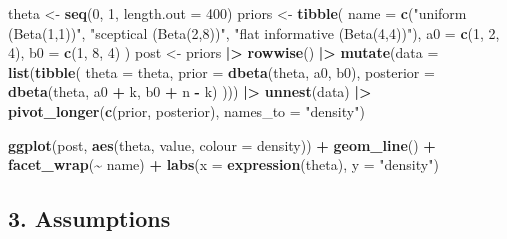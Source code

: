 \documentclass[
]{article}
\newenvironment{Shaded}{\begin{snugshade}}{\end{snugshade}}
\newcommand{\AttributeTok}[1]{\textcolor[rgb]{0.13,0.29,0.53}{#1}}
\newcommand{\DecValTok}[1]{\textcolor[rgb]{0.00,0.00,0.81}{#1}}
\newcommand{\FunctionTok}[1]{\textcolor[rgb]{0.13,0.29,0.53}{\textbf{#1}}}
\newcommand{\NormalTok}[1]{#1}
\newcommand{\OtherTok}[1]{\textcolor[rgb]{0.56,0.35,0.01}{#1}}
\newcommand{\SpecialCharTok}[1]{\textcolor[rgb]{0.81,0.36,0.00}{\textbf{#1}}}
\newcommand{\StringTok}[1]{\textcolor[rgb]{0.31,0.60,0.02}{#1}}
\begin{document}
\begin{Shaded}
\begin{Highlighting}[]
\NormalTok{theta }\OtherTok{\textless{}{-}} \FunctionTok{seq}\NormalTok{(}\DecValTok{0}\NormalTok{, }\DecValTok{1}\NormalTok{, }\AttributeTok{length.out =} \DecValTok{400}\NormalTok{)}
\NormalTok{priors }\OtherTok{\textless{}{-}} \FunctionTok{tibble}\NormalTok{(}
  \AttributeTok{name =} \FunctionTok{c}\NormalTok{(}\StringTok{"uniform (Beta(1,1))"}\NormalTok{, }\StringTok{"sceptical (Beta(2,8))"}\NormalTok{, }\StringTok{"flat informative (Beta(4,4))"}\NormalTok{),}
  \AttributeTok{a0   =} \FunctionTok{c}\NormalTok{(}\DecValTok{1}\NormalTok{, }\DecValTok{2}\NormalTok{, }\DecValTok{4}\NormalTok{),}
  \AttributeTok{b0   =} \FunctionTok{c}\NormalTok{(}\DecValTok{1}\NormalTok{, }\DecValTok{8}\NormalTok{, }\DecValTok{4}\NormalTok{)}
\NormalTok{)}
\NormalTok{post }\OtherTok{\textless{}{-}}\NormalTok{ priors }\SpecialCharTok{|\textgreater{}}
  \FunctionTok{rowwise}\NormalTok{() }\SpecialCharTok{|\textgreater{}}
  \FunctionTok{mutate}\NormalTok{(}\AttributeTok{data =} \FunctionTok{list}\NormalTok{(}\FunctionTok{tibble}\NormalTok{(}
    \AttributeTok{theta =}\NormalTok{ theta,}
    \AttributeTok{prior =} \FunctionTok{dbeta}\NormalTok{(theta, a0, b0),}
    \AttributeTok{posterior =} \FunctionTok{dbeta}\NormalTok{(theta, a0 }\SpecialCharTok{+}\NormalTok{ k, b0 }\SpecialCharTok{+}\NormalTok{ n }\SpecialCharTok{{-}}\NormalTok{ k)}
\NormalTok{  ))) }\SpecialCharTok{|\textgreater{}}
  \FunctionTok{unnest}\NormalTok{(data) }\SpecialCharTok{|\textgreater{}}
  \FunctionTok{pivot\_longer}\NormalTok{(}\FunctionTok{c}\NormalTok{(prior, posterior), }\AttributeTok{names\_to =} \StringTok{"density"}\NormalTok{)}

\FunctionTok{ggplot}\NormalTok{(post, }\FunctionTok{aes}\NormalTok{(theta, value, }\AttributeTok{colour =}\NormalTok{ density)) }\SpecialCharTok{+}
  \FunctionTok{geom\_line}\NormalTok{() }\SpecialCharTok{+} \FunctionTok{facet\_wrap}\NormalTok{(}\SpecialCharTok{\textasciitilde{}}\NormalTok{ name) }\SpecialCharTok{+}
  \FunctionTok{labs}\NormalTok{(}\AttributeTok{x =} \FunctionTok{expression}\NormalTok{(theta), }\AttributeTok{y =} \StringTok{"density"}\NormalTok{)}
\end{Highlighting}
\end{Shaded}

\subsection{3. Assumptions}\label{assumptions}
\end{document}
